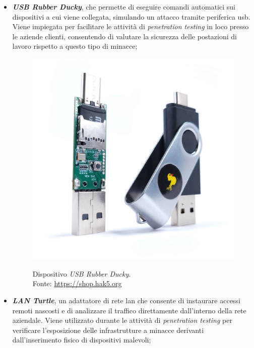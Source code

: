 \begin{itemize}
    \item \textbf{\textit{USB Rubber Ducky}}, che permette di eseguire comandi automatici sui dispositivi a cui viene collegata, simulando un attacco tramite periferica \gls{usb}. Viene impiegata per facilitare le attività di \textit{penetration testing} in loco presso le aziende clienti, consentendo di valutare la sicurezza delle postazioni di lavoro rispetto a questo tipo di minacce;\\
    \begin{figure}[H]
    \centering
    \includegraphics[alt={USB Rubber Ducky}, width=0.8\columnwidth]{img/usb-rubber-ducky_mk2_2000x.jpg}
    \caption{Dispositivo \textit{USB Rubber Ducky}.\\ Fonte: \url{https://shop.hak5.org}}
    \label{fig:usb-rubber-ducky}
    \end{figure}
    \item \textbf{\textit{LAN Turtle}}, un adattatore di rete \gls{lan} che consente di instaurare accessi remoti nascosti e di analizzare il traffico direttamente dall'interno della rete aziendale. Viene utilizzato durante le attività di \textit{penetration testing} per verificare l'esposizione delle infrastrutture a minacce derivanti dall'inserimento fisico di dispositivi malevoli;
    \begin{figure}[H]
    \centering

\end{figure}
\end{itemize}
